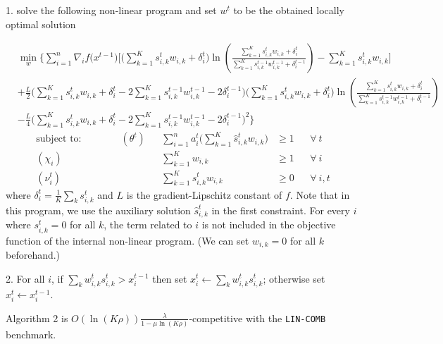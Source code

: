 1. solve the following non-linear program and set $w^t$ to be the obtained locally optimal solution

\begin{align*}
&\min_{w} \biggl\{\sum_{i=1}^{n}
\nabla_{i} f\bigl(x^{t-1} \bigr) \biggl[  \biggl(\sum_{k=1}^{K} s_{i,k}^{t} w_{i,k}  + \delta_{i}^{t} \biggr)
\ln \left(\frac{ \sum_{k=1}^{K} s_{i,k}^{t} w_{i,k}  + \delta_{i}^{t} }{\sum_{k=1}^{K} s_{i,k}^{t-1} w_{i,k}^{t-1} + \delta_{i}^{t-1}}\right)
- \sum_{k=1}^{K}  s_{i,k}^{t} w_{i,k} \biggr] \\
%
&+ \frac{L}{2}\biggl( \sum_{k=1}^{K} s_{i,k}^{t} w_{i,k} + \delta_{i}^{t}  - 2\sum_{k=1}^{K} s_{i,k}^{t-1} w_{i,k}^{t-1} - 2\delta_{i}^{t-1} \biggr) \biggl(\sum_{k=1}^{K} s_{i,k}^{t} w_{i,k} + \delta_{i}^{t} \biggr)
\ln \left(\frac{ \sum_{k=1}^{K} s_{i,k}^{t} w_{i,k}  + \delta_{i}^{t} }{\sum_{k=1}^{K} s_{i,k}^{t-1} w_{i,k}^{t-1}  + \delta_{i}^{t-1}}\right) \\
%
&- \frac{L}{4} \biggl( \sum_{k=1}^{K} s_{i,k}^{t} w_{i,k} + \delta_{i}^{t}  - 2\sum_{k=1}^{K} s_{i,k}^{t-1} w_{i,k}^{t-1} - 2\delta_{i}^{t-1} \biggr)^{2}
\biggr\}
\end{align*}
%
%
\begin{align*}
\text{subject to:}   \qquad \qquad
    (\theta^{t})  && \sum_{i=1}^{n} a_{i}^{t} \biggl( \sum_{k=1}^{K}  \hat{s}_{i,k}^{t} w_{i,k} \biggr) &\geq 1 && \forall\ t\\
    (\chi_{i}) && \sum_{k=1}^{K}  w_{i,k} &\geq 1 && \forall\ i\\
    (\nu_{i}^{t}) && \sum_{k=1}^{K} s_{i,k}^{t} w_{i,k} &\geq 0 && \forall\ i,t
\end{align*}
%
where $\delta_{i}^{t} = \frac{1}{K} \sum_{k} s_{i,k}^{t}$ and $L$ is the gradient-Lipschitz constant of $f$.
Note that in this program, we use the auxiliary solution $\hat{s}_{i,k}^{t}$ in the first constraint. For every $i$ where $s_{i,k}^{t} = 0$ for all $k$, the term related to $i$ is not included in the objective function of the internal non-linear program.
(We can set $w_{i,k} = 0$ for all $k$ beforehand.)
%

2. For all $i$, if $\sum_{k} w_{i,k}^{t} s_{i,k}^{t} > x_{i}^{t-1}$ then set $x_{i}^{t} \gets \sum_{k} w_{i,k}^{t} s_{i,k}^{t}$;
otherwise set $x_{i}^{t} \gets x_{i}^{t-1}$.


\begin{theorem} \label{convex-covering-theorem}
Algorithm 2 is $O(\ln(K \rho)) \frac{\lambda}{1 - \mu \ln (K\rho)}$-competitive with the \texttt{LIN-COMB} benchmark.
\end{theorem}
